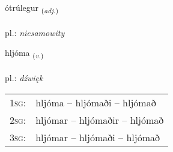 \documentclass[frontgrid, backgrid]{flacards}\usepackage[]{graphicx}\usepackage[]{xcolor}
\begin{document}
{ótrúlegur \small{\textsubscript{(\textit{adj.})}} \\[1ex] %
\textphonetic{[ouːtʰrulɛɣʏr]} \\
pl.: \emph{niesamowity} \\  [2ex]
\renewcommand*{\arraystretch}{0.8}
}

\renewcommand{\flhead}{\vskip5pt \fboxsep=0pt {\small\bfseries\footnotesize Sagnorð | Verb}}
\renewcommand{\fcfoot}{\vskip5pt \fboxsep=0pt \hspace{2pt}{\small\bfseries\footnotesize 2K}}

\renewcommand{\blhead}{\vskip5pt {\small\bfseries\footnotesize Sagnorð | Verb }}
\renewcommand{\bcfoot}{\vskip5pt \hspace{2pt}{\small\bfseries\footnotesize 2K}}


{hljóma \small{\textsubscript{(\textit{v.})}} \\[1ex] %
\textphonetic{[l̥jouːma]} \\
pl.: \emph{dźwięk} \\  [2ex]
\renewcommand*{\arraystretch}{0.8}
\begin{tabular}{p{1cm}l}
\textsc{1sg}: & hljóma -- hljómaði -- hljómað \\ 
\textsc{2sg}: & hljómar -- hljómaðir -- hljómað \\ 
\textsc{3sg}: & hljómar -- hljómaði -- hljómað \\ 
\end{tabular}
}

\renewcommand{\flhead}{\vskip5pt \fboxsep=0pt {\small\bfseries\footnotesize Lýsingarorð | Adjective}}
\renewcommand{\fcfoot}{\vskip5pt \fboxsep=0pt \hspace{2pt}{\small\bfseries\footnotesize 2K}}
\end{document}
